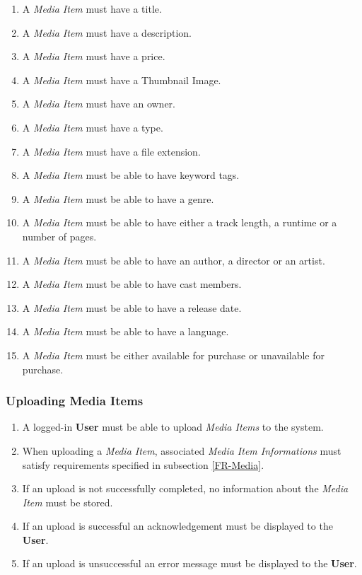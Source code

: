 \documentclass[../report.tex]{subfiles}
\begin{document}
\begin{enumerate}[label=\textbf{FR-\twodigits*}, resume]
	\item A \textit{Media Item} must have a title.
	\item A \textit{Media Item} must have a description.
	\item A \textit{Media Item} must have a price.
	\item A \textit{Media Item} must have a Thumbnail Image.
	\item A \textit{Media Item} must have an owner.
	\item A \textit{Media Item} must have a type.
	\item A \textit{Media Item} must have a file extension.
	\item A \textit{Media Item} must be able to have keyword tags.
	\item A \textit{Media Item} must be able to have a genre.
	\item A \textit{Media Item} must be able to have either a track length, a runtime or a number of pages.
	\item A \textit{Media Item} must be able to have an author, a director or an artist.
	\item A \textit{Media Item} must be able to have cast members.
	\item A \textit{Media Item} must be able to have a release date.
	\item A \textit{Media Item} must be able to have a language.
	
	\item A \textit{Media Item} must be either available for purchase or unavailable for purchase.
\end{enumerate}

\subsubsection {Uploading Media Items}

\begin{enumerate}[label=\textbf{FR-\twodigits*}, resume]
	\item A logged-in \textbf{User} must be able to upload \textit{Media Items} to the system.
	\item When uploading a \textit{Media Item}, associated \textit{Media Item Informations} must satisfy requirements specified in subsection \ref{FR-Media}.
	\item If an upload is not successfully completed, no information about the \textit{Media Item} must be stored.
	\item If an upload is successful an acknowledgement must be displayed to the \textbf{User}.
	\item If an upload is unsuccessful an error message must be displayed to the \textbf{User}. 
\end{enumerate}
\end{document}
